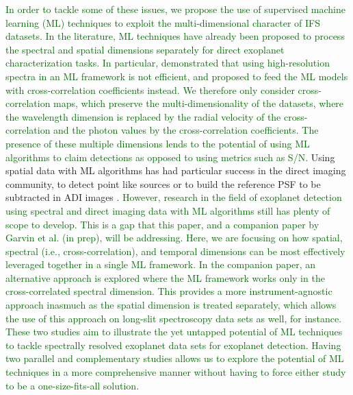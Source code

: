 \documentclass[referee]{aa} %
\newcommand{\newchange}[1]{\textcolor{darkgreen}{#1}}
\begin{document}
\newchange{In order to tackle some of these issues, we propose the use of supervised machine learning (ML) techniques to exploit the multi-dimensional character of IFS datasets. In the literature, ML techniques have already been proposed to process the spectral and spatial dimensions separately for direct exoplanet characterization tasks. In particular, \citet{2020Fisher} demonstrated that using high-resolution spectra in an ML framework is not efficient, and proposed to feed the ML models with cross-correlation coefficients instead. 
We therefore only consider cross-correlation maps, which preserve the multi-dimensionality of the datasets, where the wavelength dimension is replaced by the radial velocity of the cross-correlation and the photon values by the cross-correlation coefficients.  The presence of these multiple dimensions lends to the potential of using ML algorithms to claim detections as opposed to using metrics such as S/N.}
Using spatial data with ML algorithms has had particular success in the direct imaging community, to detect point like sources \citep{2018Gomez,2023Carlito} or to build the reference PSF to be subtracted in ADI images \citep{2022Gebhard,2023Flasseur}.
\newchange{However, research in the field of exoplanet detection using spectral and direct imaging data with ML algorithms still has plenty of scope to develop. This is a gap that this paper, and a companion paper by Garvin et al. (in prep), will be addressing.
Here, we are focusing on how spatial, spectral (i.e., cross-correlation), and temporal dimensions can be most effectively leveraged together in a single ML framework. In the companion paper, an alternative approach is explored where the ML framework works only in the cross-correlated spectral dimension. This provides a more instrument-agnostic approach inasmuch as the spatial dimension is treated separately, which allows the use of this approach on long-slit spectroscopy data sets as well, for instance. These two studies aim to illustrate the yet untapped potential of ML techniques to tackle spectrally resolved exoplanet data sets for exoplanet detection.
Having two parallel and complementary studies allows us to explore the potential of ML techniques in a more comprehensive manner without having to force either study to be a one-size-fits-all solution.}
\end{document}
